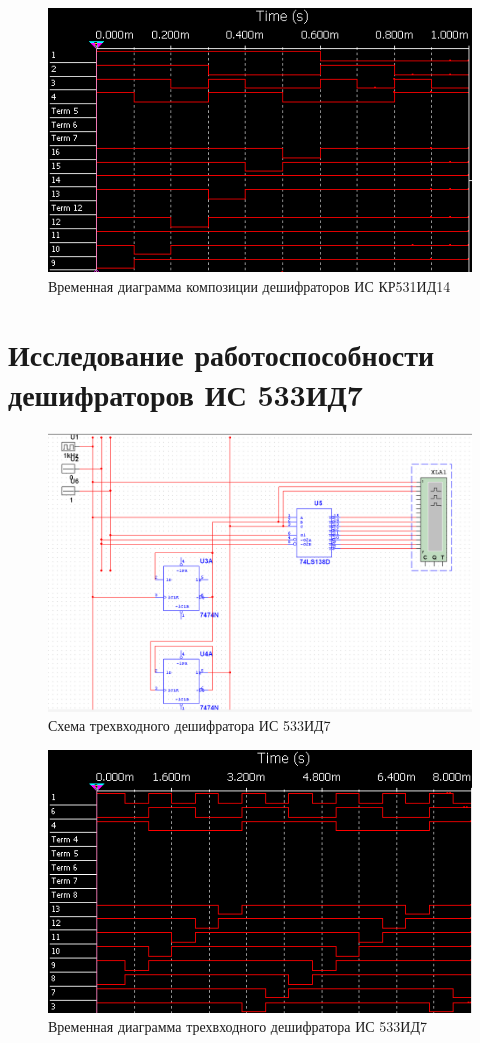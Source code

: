 \begin{figure}[ht]
	\centering
	\includegraphics[width=0.7\linewidth]{img/DC3-8-out}
	\caption{Временная диаграмма композиции дешифраторов ИС КР531ИД14}
	\label{fig:dc3-8-out}
\end{figure}

\chapter{Исследование работоспособности дешифраторов ИС 533ИД7}

\begin{figure}[ht]
	\centering
	\includegraphics[width=1\linewidth]{img/DC3-8-solid}
	\caption{Схема трехвходного дешифратора ИС 533ИД7}
	\label{fig:dc3-8-solid}
\end{figure}


\begin{figure}[ht]
	\centering
	\includegraphics[width=0.7\linewidth]{img/DC3-8-solid-out}
	\caption{Временная диаграмма трехвходного дешифратора ИС 533ИД7}
	\label{fig:dc3-8-solid-out}
\end{figure}

